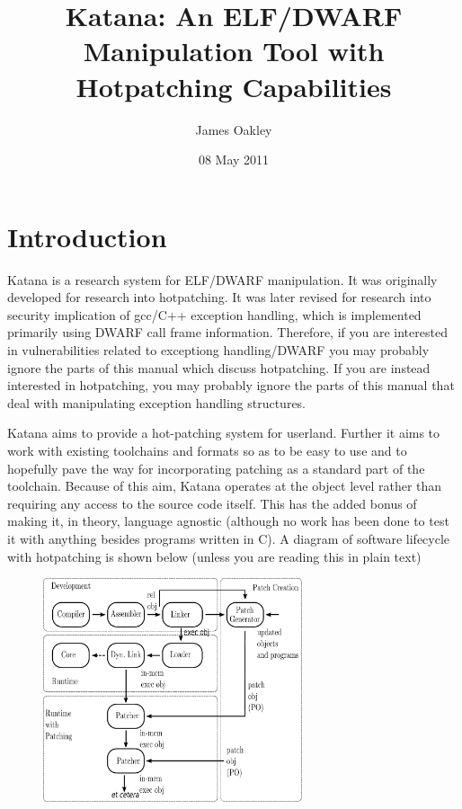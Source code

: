 \documentclass[11pt]{article}
\title{Katana: An ELF/DWARF Manipulation Tool with Hotpatching Capabilities}
\author{James Oakley}
\date{08 May 2011}
\begin{document}
\maketitle

\setcounter{tocdepth}{3}
\tableofcontents
\vspace*{1cm}


\section{Introduction}
\label{sec-1}

  Katana is a research system for ELF/DWARF manipulation. It was
  originally developed for research into hotpatching. It was later
  revised for research into security implication of gcc/C++ exception
  handling, which is implemented primarily using DWARF call frame
  information. Therefore, if you are interested in vulnerabilities
  related to exceptiong handling/DWARF you may probably ignore the
  parts of this manual which discuss hotpatching. If you are instead
  interested in hotpatching, you may probably ignore the parts of this
  manual that deal with manipulating exception handling structures.
  
  Katana aims to provide a hot-patching system for userland. Further
  it aims to work with existing toolchains and formats so as to be
  easy to use and to hopefully pave the way for incorporating patching
  as a standard part of the toolchain. Because of this aim, Katana
  operates at the object level rather than requiring any access to the
  source code itself. This has the added bonus of making it, in
  theory, language agnostic (although no work has been done to test it
  with anything besides programs written in C). A diagram of software
  lifecycle with hotpatching is shown below (unless you are reading this in plain text)


\begin{figure}[h!]
\includegraphics[width=3in]{./softwarelifecycle.pdf}
\end{figure}
\end{document}
